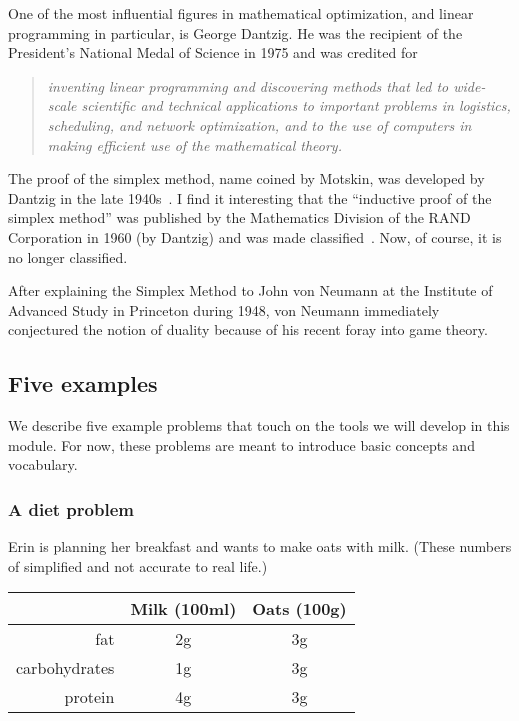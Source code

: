 \documentclass[a4paper, 12pt]{article}
\numberwithin{equation}{section}
\numberwithin{figure}{section}
\theoremstyle{definition}
\begin{document}
One of the most influential figures in mathematical optimization, and linear
programming in particular, is George Dantzig. He was the recipient of the
President's National Medal of Science in 1975 \cite{NSF} and was credited for 
\begin{quote}
	\emph{inventing linear programming and discovering methods that led to wide-scale scientific and technical applications to important problems in logistics, scheduling, and network optimization, and to the use of computers in making efficient use of the mathematical theory.}
\end{quote}
The proof of the simplex method, name coined by Motskin, was developed by
Dantzig in the late 1940s~\cite{Dantzig}. I find it interesting that the
``inductive proof of the simplex method'' was published by the Mathematics
Division of the RAND Corporation in 1960 (by Dantzig) and was made
classified~\cite{SimplexMethod}. Now, of course, it is no longer classified.

After explaining the Simplex Method to John von Neumann at the Institute of
Advanced Study in Princeton during 1948, von Neumann immediately conjectured the
notion of duality because of his recent foray into game theory. 

\subsection{Five examples}

We describe five example problems that touch on the tools we will develop in
this module. For now, these problems are meant to introduce basic concepts and
vocabulary.

\subsubsection{A diet problem}

Erin is planning her breakfast and wants to make oats with milk. (These
numbers of simplified and not accurate to real life.)
\begin{center}
	\begin{tabular}{|r|c|c|} \hline
		& Milk (100ml) & Oats (100g) \\ \hline 
		fat & 2g & 3g \\ 
		carbohydrates & 1g & 3g \\
		protein & 4g & 3g \\ \hline
	\end{tabular}
\end{center}
\end{document}
